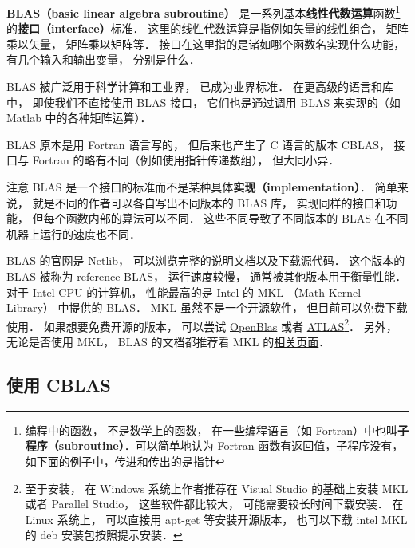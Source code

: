 

\textbf{BLAS（basic linear algebra subroutine）} 是一系列基本\textbf{线性代数运算}函数\footnote{编程中的函数， 不是数学上的函数， 在一些编程语言（如 Fortran）中也叫\textbf{子程序（subroutine）}．可以简单地认为 Fortran 函数有返回值，子程序没有，如下面的例子中，传进和传出的是指针}的\textbf{接口（interface）}标准．  这里的线性代数运算是指例如矢量的线性组合， 矩阵乘以矢量， 矩阵乘以矩阵等． 接口在这里指的是诸如哪个函数名实现什么功能， 有几个输入和输出变量， 分别是什么．

BLAS 被广泛用于科学计算和工业界， 已成为业界标准． 在更高级的语言和库中， 即使我们不直接使用 BLAS 接口， 它们也是通过调用 BLAS 来实现的（如 Matlab 中的各种矩阵运算）．

BLAS 原本是用 Fortran 语言写的， 但后来也产生了 C 语言的版本 CBLAS， 接口与 Fortran 的略有不同（例如使用指针传递数组）， 但大同小异．

注意 BLAS 是一个接口的标准而不是某种具体\textbf{实现（implementation）}． 简单来说， 就是不同的作者可以各自写出不同版本的 BLAS 库， 实现同样的接口和功能， 但每个函数内部的算法可以不同．  这些不同导致了不同版本的 BLAS 在不同机器上运行的速度也不同．

BLAS 的官网是 \href{http://www.netlib.org/blas/}{Netlib}， 可以浏览完整的说明文档以及下载源代码． 这个版本的 BLAS 被称为 reference BLAS， 运行速度较慢， 通常被其他版本用于衡量性能． 对于 Intel CPU 的计算机， 性能最高的是 Intel 的 \href{https://software.intel.com/en-us/mkl}{MKL （Math Kernel Library）} 中提供的 \href{https://software.intel.com/en-us/mkl-developer-reference-c-blas-and-sparse-blas-routines}{BLAS}． MKL 虽然不是一个开源软件， 但目前可以免费下载使用． 如果想要免费开源的版本， 可以尝试 \href{https://www.openblas.net/}{OpenBlas} 或者 \href{https://sourceforge.net/projects/math-atlas/}{ATLAS}\footnote{至于安装， 在 Windows 系统上作者推荐在 Visual Studio 的基础上安装 MKL 或者 Parallel Studio， 这些软件都比较大， 可能需要较长时间下载安装． 在 Linux 系统上， 可以直接用 apt-get 等安装开源版本， 也可以下载 intel MKL 的 deb 安装包按照提示安装．}． 另外， 无论是否使用 MKL， BLAS 的文档都推荐看 MKL 的\href{https://software.intel.com/en-us/mkl-developer-reference-c-blas-and-sparse-blas-routines}{相关页面}．

\subsection{使用 CBLAS}

